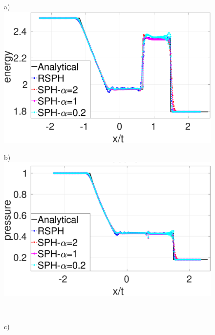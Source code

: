 \begin{figure}
    \centering
    \begin{minipage}{.495\textwidth}
        \centering a)
        \includegraphics[width=0.99 \textwidth,height=0.7\textwidth]{./Chapter-4/Figures/Sod/RCM-Sod-SPH-alf-e}
    \end{minipage}%
    \begin{minipage}{.495 \textwidth}
        \centering b)
        \includegraphics[width=0.99 \textwidth,height=0.7\textwidth]{./Chapter-4/Figures/Sod/RCM-Sod-SPH-alf-p}
    \end{minipage}%
    \\
    \begin{minipage}{.495 \textwidth}
        \centering c)

\end{minipage}
\end{figure}
